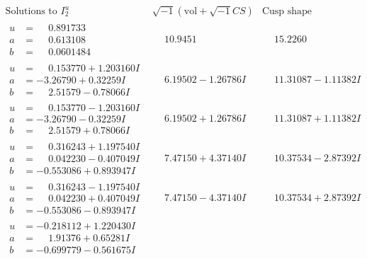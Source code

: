 \documentclass[1p]{elsarticle_modified}
\theoremstyle{definition}
\newcommand{\I}{\sqrt{-1}}
\begin{document}
$$\begin{array}{c|c|c}  
\text{Solutions to }I^u_{2}& \I (\text{vol} + \sqrt{-1}CS) & \text{Cusp shape}\\
 \hline 
\begin{aligned}
u &= \phantom{-}0.891733\phantom{ +0.000000I} \\
a &= \phantom{-}0.613108\phantom{ +0.000000I} \\
b &= \phantom{-}0.0601484\phantom{ +0.000000I}\end{aligned}
 & \phantom{-}10.9451\phantom{ +0.000000I} & \phantom{-}15.2260\phantom{ +0.000000I} \\ \hline\begin{aligned}
u &= \phantom{-}0.153770 + 1.203160 I \\
a &= -3.26790 + 0.32259 I \\
b &= \phantom{-}2.51579 - 0.78066 I\end{aligned}
 & \phantom{-}6.19502 - 1.26786 I & \phantom{-}11.31087 - 1.11382 I \\ \hline\begin{aligned}
u &= \phantom{-}0.153770 - 1.203160 I \\
a &= -3.26790 - 0.32259 I \\
b &= \phantom{-}2.51579 + 0.78066 I\end{aligned}
 & \phantom{-}6.19502 + 1.26786 I & \phantom{-}11.31087 + 1.11382 I \\ \hline\begin{aligned}
u &= \phantom{-}0.316243 + 1.197540 I \\
a &= \phantom{-}0.042230 - 0.407049 I \\
b &= -0.553086 + 0.893947 I\end{aligned}
 & \phantom{-}7.47150 + 4.37140 I & \phantom{-}10.37534 - 2.87392 I \\ \hline\begin{aligned}
u &= \phantom{-}0.316243 - 1.197540 I \\
a &= \phantom{-}0.042230 + 0.407049 I \\
b &= -0.553086 - 0.893947 I\end{aligned}
 & \phantom{-}7.47150 - 4.37140 I & \phantom{-}10.37534 + 2.87392 I \\ \hline\begin{aligned}
u &= -0.218112 + 1.220430 I \\
a &= \phantom{-}1.91376 + 0.65281 I \\
b &= -0.699779 - 0.561675 I\end{aligned}

\end{array}$$
\end{document}
